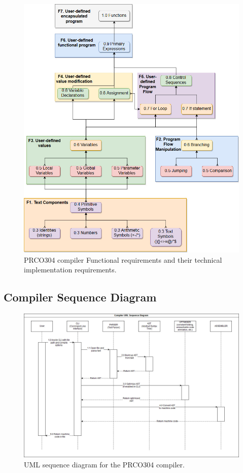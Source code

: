 \documentclass[11pt,a4paper]{report}
\newcommand{\scname}{PRCO304}
\begin{document}
\begin{figure}[H]
\begin{center}
\includegraphics[scale=0.5]{compiler_dependencies}
\end{center}
\caption{\scname{} compiler Functional requirements and their technical implementation requirements.}
\label{fig:compiler_dependencies}
\end{figure}

\subsection{Compiler Sequence Diagram}
\label{sect:compiler_seq_uml}
\begin{figure}[H]
\begin{center}
\includegraphics[scale=0.4]{fig_compiler_uml_seq}
\end{center}
\caption{UML sequence diagram for the \scname{} compiler.}
\label{fig:hld}
\end{figure}
\end{document}
